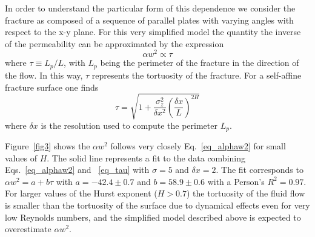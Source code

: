\documentclass[aps,pre,
superscriptaddress,
twocolumn,
notitlepage,
10pt,
]{revtex4-1}
\begin{document}
In order to understand the particular form of this dependence we consider
the fracture as composed of a sequence of parallel plates with varying
angles with respect to the x-y plane. For this very simplified model the
quantity the inverse of the permeability can be approximated by the 
expression
\begin{equation}\label{eq_alphaw2}
\alpha w^2 \propto \tau
\end{equation}
where $\tau \equiv L_p/L$, with $L_p$ being the perimeter of the fracture
in the direction of the flow. In this way, $\tau$ represents the tortuosity
of the fracture. For a self-affine fracture surface one finds
\begin{equation}\label{eq_tau}
\tau = \sqrt{1+\frac{\sigma_z^2}{\delta x^2} \left( \frac{\delta
		x}{L}\right)^{2H}}
\end{equation}
where $\delta x$ is the resolution used to compute the perimeter $L_p$.

Figure~\ref{fig3} shows the $\alpha w^2$ follows very closely
Eq.~\eqref{eq_alphaw2} for small values of $H$.  The solid line represents a fit
to the data combining Eqs.~\eqref{eq_alphaw2} and ~\eqref{eq_tau} with
$\sigma=5$ and $\delta x = 2$. The fit corresponds to $\alpha w^2 = a+b \tau$
with $a=-42.4\pm0.7$ and $b=58.9\pm0.6$ with a Person's $R^2=0.97$. For larger values of the Hurst exponent
($H> 0.7$) the tortuosity of the fluid flow is smaller than the tortuosity of
the surface due to dynamical effects even for very low Reynolds numbers, and the
simplified model described above is expected to overestimate $\alpha w^2$.

\end{document}
